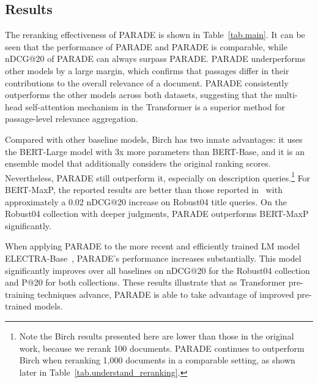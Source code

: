 \documentclass[11pt,a4paper]{article}
\newcommand{\parade}[1]{PARADE}
\begin{document}
\subsection{Results}
\label{sec:results}

The reranking effectiveness of PARADE is shown in Table~\ref{tab.main}.
It can be seen that the performance of \parade{Max} and \parade{Attn} is comparable, while nDCG@20 of \parade{Attn} can always surpass \parade{Max}.
\parade{Avg} underperforms other models by a large margin, which confirms that passages differ in their contributions to the overall relevance of a document.
PARADE consistently outperforms the other models across both datasets, suggesting that the multi-head self-attention mechanism in the Transformer is a superior method for passage-level relevance aggregation.

Compared with other baseline models,
Birch has two innate advantages: it uses the BERT-Large model with 3x more parameters than BERT-Base, and it is an ensemble model that additionally considers the original ranking scores.
Nevertheless, PARADE still outperform it, especially on description queries.\footnote{Note the Birch results presented here are lower than those in the original work, because we rerank 100 documents. PARADE continues to outperform Birch when reranking 1,000 documents in a comparable setting, as shown later in Table~\ref{tab.understand_reranking}.}
For BERT-MaxP, the reported results are better than those reported in~\cite{DBLP:conf/sigir/DaiC19} with approximately a 0.02 nDCG@20 increase on Robust04 title queries.
On the Robust04 collection with deeper judgments, PARADE outperforms BERT-MaxP significantly.

When applying PARADE to the more recent and efficiently trained LM model ELECTRA-Base~\cite{DBLP:conf/iclr/ClarkLLM20}, PARADE's performance increases substantially.
This model significantly improves over all baselines on nDCG@20 for the Robust04 collection and P@20 for both collections.
These results illustrate that as Transformer pre-training techniques advance, PARADE is able to take advantage of improved pre-trained models.
\end{document}
